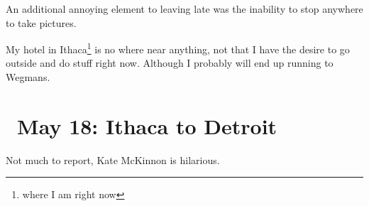\documentclass[../butidigress.tex]{subfiles}
\begin{document}
An additional annoying element to leaving late was the inability to stop anywhere to take pictures.

My hotel in Ithaca\footnote{where I am right now} is no where near anything, not that I have the desire to go outside and do stuff right now.
Although I probably will end up running to Wegmans.

\section{\ May 18: Ithaca to Detroit}
Not much to report, Kate McKinnon is hilarious.


\renewcommand{\thesection}{\thechapter .\arabic{section}}

\newlength{\episkip}
\setlength{\episkip}{0.5cm}
\newcommand{\postepi}{\vspace{\episkip}\noindent\hfill\rule{0.5\textwidth}{1pt}\hfill\vspace{\episkip}}
\end{document}
